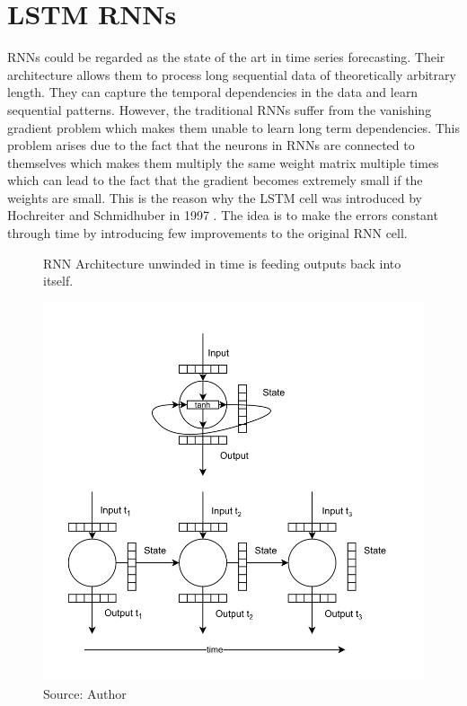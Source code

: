 \section{\acl{LSTM} \acl{RNN}s}

\acl{RNN}s could be regarded as the state of the art in time series forecasting.
Their architecture allows them to process long sequential data
of theoretically arbitrary length. They can capture the temporal dependencies
in the data and learn sequential patterns. However, the traditional \ac{RNN}s
suffer from the vanishing gradient problem which makes them unable to learn 
long term dependencies. This problem arises
due to the fact that the neurons in \ac{RNN}s are connected to themselves
which makes them multiply the same weight matrix multiple
times which can lead to the fact that the gradient becomes extremely small if the 
weights are small. This is the reason why the \ac{LSTM} cell was
introduced by Hochreiter and Schmidhuber in 1997 \citep{Hochreiter1997}.
The idea is to make the errors constant through time by introducing few improvements
to the original \ac{RNN} cell.

\begin{figure}[!h]
    \centering
    \caption{\acl{RNN} Architecture unwinded in time 
    is feeding outputs back into itself.}
    \includegraphics[width=1\textwidth]{Figures/RNN.drawio.png}
    \caption*{Source: Author}
    \label{fig:rnn_architecture}
\end{figure}

